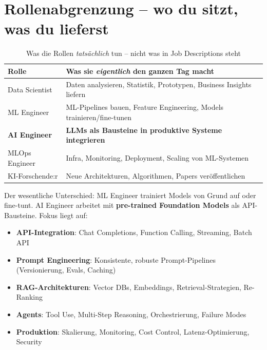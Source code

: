\section{Rollenabgrenzung -- wo du sitzt, was du lieferst}

\begin{table}[H]
\centering
\begin{tabularx}{\linewidth}{lX}
\toprule
\textbf{Rolle} & \textbf{Was sie \textit{eigentlich} den ganzen Tag macht} \\
\midrule
Data Scientist & Daten analysieren, Statistik, Prototypen, Business Insights liefern \\
ML Engineer & ML-Pipelines bauen, Feature Engineering, Models trainieren/fine-tunen \\
\textbf{AI Engineer} & \textbf{LLMs als Bausteine in produktive Systeme integrieren} \\
MLOps Engineer & Infra, Monitoring, Deployment, Scaling von ML-Systemen \\
KI-Forschende:r & Neue Architekturen, Algorithmen, Papers veröffentlichen \\
\bottomrule
\end{tabularx}
\caption{Was die Rollen \textit{tatsächlich} tun -- nicht was in Job Descriptions steht}
\label{tab:rollenvergleich}
\end{table}


Der wesentliche Unterschied: ML Engineer trainiert Models von Grund auf oder fine-tunt. AI Engineer arbeitet mit \textbf{pre-trained Foundation Models} als API-Bausteine. Fokus liegt auf:
\begin{itemize}[leftmargin=*]
    \item \textbf{API-Integration}: Chat Completions, Function Calling, Streaming, Batch API
    \item \textbf{Prompt Engineering}: Konsistente, robuste Prompt-Pipelines (Versionierung, Evals, Caching)
    \item \textbf{RAG-Architekturen}: Vector DBs, Embeddings, Retrieval-Strategien, Re-Ranking
    \item \textbf{Agents}: Tool Use, Multi-Step Reasoning, Orchestrierung, Failure Modes
    \item \textbf{Produktion}: Skalierung, Monitoring, Cost Control, Latenz-Optimierung, Security
\end{itemize}

